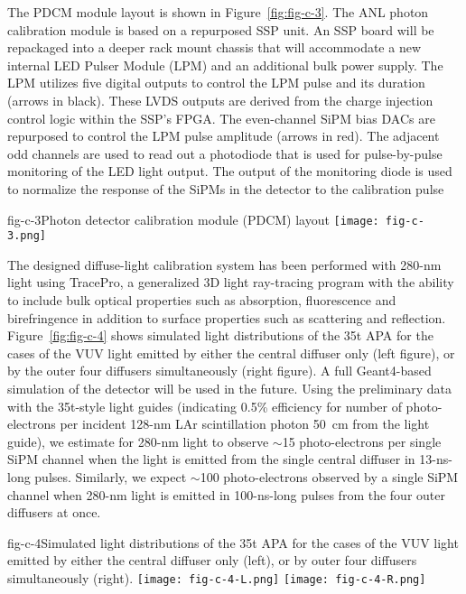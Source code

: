The PDCM module layout is shown in Figure~\ref{fig:fig-c-3}. The ANL
photon calibration module is based on a repurposed SSP unit.  An SSP
board will be repackaged into a deeper rack mount chassis that will
accommodate a new internal LED Pulser Module (LPM) and an additional
bulk power supply. The LPM utilizes five digital outputs to control
the LPM pulse and its duration (arrows in black).  These LVDS outputs
are derived from the charge injection control logic within the SSP's
FPGA.  The even-channel SiPM bias DACs are repurposed to control the
LPM pulse amplitude (arrows in red).  The adjacent odd channels are
used to read out a photodiode that is used for pulse-by-pulse
monitoring of the LED light output.  The output of the monitoring
diode is used to normalize the response of the SiPMs in the detector
to the calibration pulse

\begin{cdrfigure}{fig-c-3}{Photon detector calibration module (PDCM) layout}
\texttt{[image: fig-c-3.png]}
\end{cdrfigure}


The designed
diffuse-light calibration system has been performed with 280-nm light using TracePro, a generalized 3D
light ray-tracing program with the ability to include bulk optical
properties such as absorption, fluorescence and birefringence in addition
to surface properties such as scattering and
reflection. Figure~\ref{fig:fig-c-4} shows simulated light distributions
of the 35t APA for the cases of the VUV light emitted by either
the central diffuser only (left figure), or by the outer four diffusers
simultaneously (right figure). A full Geant4-based simulation of the
detector will be used in the future. Using the preliminary data with
the 35t-style light guides (indicating 0.5\% efficiency for number
of photo-electrons per incident 128-nm LAr scintillation photon 50~cm
from the light guide), we estimate for 280-nm light to observe $\sim$15
photo-electrons per single SiPM channel when the light is emitted from
the single central diffuser in 13-ns-long pulses. Similarly, we expect
$\sim$100 photo-electrons observed by a single SiPM channel when 280-nm light is emitted in 100-ns-long pulses from the four outer
diffusers at once.

%
\begin{cdrfigure}{fig-c-4}{Simulated light distributions of the 35t APA for the cases of the VUV light emitted by either the central diffuser only
  (left), or by outer four diffusers simultaneously (right).}
\texttt{[image: fig-c-4-L.png]}
\texttt{[image: fig-c-4-R.png]}
\end{cdrfigure}


